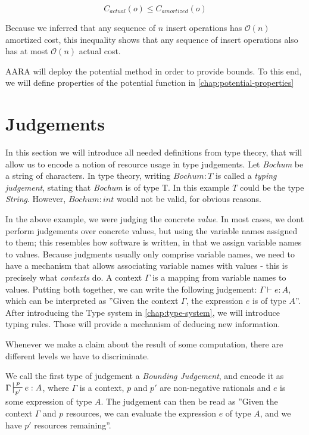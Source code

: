 \[C_{actual}(o) \leq C_{amortized}(o)\]
\label{ineq:actual-amortized}

Because we inferred that any sequence of \(n\) insert operations has \(\mathcal{O}(n)\) amortized cost, this inequality shows that any sequence of insert operations also has at most \(\mathcal{O}(n)\) actual cost.

AARA will deploy the potential method in order to provide bounds. To this end, we will define properties of the potential function in \ref{chap:potential-properties}

\section{Judgements}
 In this section we will introduce all needed definitions from type theory, that will allow us to encode a notion of resource usage in type judgements.
 Let \emph{Bochum} be a string of characters. In type theory, writing \(Bochum: T\) is called a \emph{typing judgement}, stating that \emph{Bochum} is of type T. In this example \(T\) could be the type \emph{String}. However, \(Bochum : int\) would not be valid, for obvious reasons.
 
 In the above example, we were judging the concrete \emph{value}. In most cases, we dont perform judgements over concrete values, but using the variable names assigned to them; this resembles how software is written, in that we assign variable names to values.
 Because judgments usually only comprise variable names, we need to have a mechanism that allows associating variable names with values - this is precisely what \emph{contexts} do. A context \(\Gamma\) is a mapping from variable names to values. Putting both together, we can write the following judgement: \(\Gamma \vdash e: A\), which can be interpreted as ''Given the context \(\Gamma\), the expression \(e\) is of type \(A\)''.
 After introducing the Type system in \ref{chap:type-system}, we will introduce typing rules. Those will provide a mechanism of deducing new information. 
 
Whenever we make a claim about the result of some computation, there are different levels we have to discriminate.

 We call the first type of judgement a \emph{Bounding Judgement}, and encode it as \(\Gamma \sststile{p'}{p} e : A\), where \(\Gamma\) is a context, \(p\) and \(p'\) are non-negative rationals and \(e\) is some expression of type \(A\). The judgement can then be read as ''Given the context \(\Gamma\) and \(p\) resources, we can evaluate the expression \(e\) of type \(A\), and we have \(p'\) resources remaining''.

